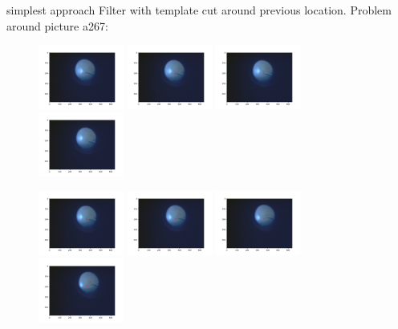 \documentclass{beamer}              %
\begin{document}
\begin{frame}{simplest approach}
Filter with template cut around previous location. Problem around picture a267:
\begin{figure}
    \centering
    \includegraphics[width=0.25\textwidth]{figs/simplest/000267.png}
    \includegraphics[width=0.25\textwidth]{figs/simplest/000268.png}
    \includegraphics[width=0.25\textwidth]{figs/simplest/000269.png}
    \includegraphics[width=0.25\textwidth]{figs/simplest/000270.png}
    
    \includegraphics[width=0.25\textwidth]{figs/simplest/000271.png}
    \includegraphics[width=0.25\textwidth]{figs/simplest/000272.png}
    \includegraphics[width=0.25\textwidth]{figs/simplest/000273.png}
    \includegraphics[width=0.25\textwidth]{figs/simplest/000274.png}
\end{figure}


\end{frame}
\end{document}
